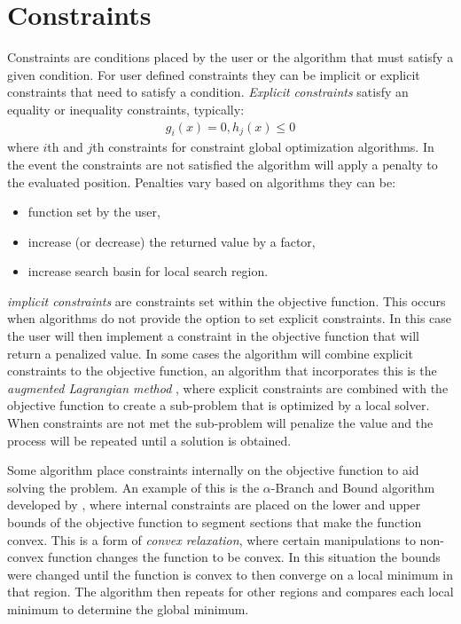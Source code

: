 \section{Constraints}
Constraints are conditions placed by the user or the algorithm that must satisfy a given condition. For user defined constraints they can be implicit or explicit constraints that need to satisfy a condition. \textit{Explicit constraints} satisfy an equality or inequality constraints, typically:
\begin{align}
    \label{eq:constraints}
    g_i(x) = 0, 
    h_j(x) \leq 0 
\end{align}
where $i$th and $j$th constraints for constraint global optimization algorithms. In the event the constraints are not satisfied the algorithm will apply a penalty to the evaluated position. Penalties vary based on algorithms they can be:
\begin{itemize}
    \item function set by the user,
    \item increase (or decrease) the returned value by a factor, 
    \item increase search basin for local search region.
\end{itemize}

\textit{implicit constraints} are constraints set within the objective function. This occurs when algorithms do not provide the option to set explicit constraints. In this case the user will then implement a constraint in the objective function that will return a penalized value. In some cases the algorithm will combine explicit constraints to the objective function, an algorithm that incorporates this is the \textit{augmented Lagrangian method} \cite{Mathematics2008}, where explicit constraints are combined with the objective function to create a
sub-problem that is optimized by a local solver. When constraints are not met the sub-problem will penalize the value and the process will be repeated until a solution is obtained.

Some algorithm place constraints internally on the objective function to aid solving the problem. An example of this is the $\alpha$-Branch and Bound algorithm developed by \cite{adjiman2013}, where internal constraints are placed on the lower and upper bounds of the objective function to segment sections that make the function convex. This is a form of \textit{convex relaxation}, where certain manipulations to non-convex function
changes the function to be convex. In this situation the bounds were changed until the function is convex to then converge on a local minimum in that region. The algorithm then repeats for other regions and compares each local minimum to determine the global minimum. 

